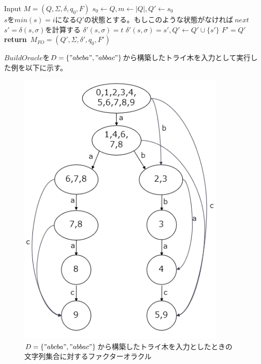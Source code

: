 \documentclass[11pt,a4paper]{jreport}
\begin{document}
  \begin{algorithm}
    \caption{$\textbf{BuildOracle}(M)$}
    \label{alg5}
    \begin{algorithmic}[1]
      \State Input $M = (Q, \Sigma, \delta, q_0, F)$
      \State $s_0 \leftarrow Q, m \leftarrow |Q|, Q' \leftarrow {s_0}$
        \State $sをmin(s)=iになるQ'の状態とする。もしこのような状態がなければ\ next$
           \State $s'=\delta(s,\sigma)を計算する$
           \State $\delta'(s,\sigma)=t$
           \Else
           \State $\delta'(s,\sigma)=s',Q'\leftarrow Q' \cup \{s'\}$
           \EndIf
        \EndFor
      \EndFor
      \State $F'=Q'$
      \State \textbf{return}\ $M_{FO} = (Q', \Sigma, \delta', q_0, F')$
    \end{algorithmic}
  \end{algorithm}

  $BuildOracle$を$D=\{"abcba", "abbac"\}$から構築したトライ木を入力として実行した例を以下に示す。

  \begin{figure}[htbp]
    \centering
    \includegraphics[width=10cm]{sub.png}
    \caption{$D=\{"abcba", "abbac"\}$から構築したトライ木を入力としたときの文字列集合に対するファクターオラクル}
  \end{figure}
\end{document}
